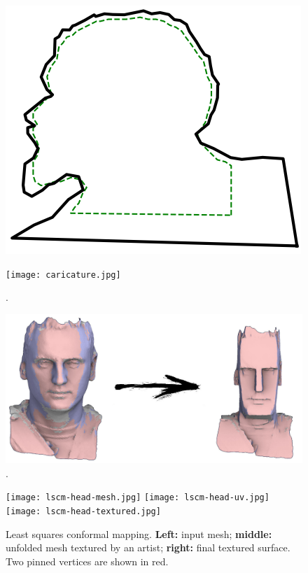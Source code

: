 \documentclass[notitlepage,oneside]{book}
\begin{document}
\begin{figure}[h]
\begin{minipage}{.25\linewidth}
    \includegraphics[width=\linewidth]{example_6.3_e.png}
    \caption{}
    \label{fig:lenin}
\end{minipage}
\end{figure}




\begin{figure}[ht]
    \centering
    \texttt{[image: caricature.jpg]}
    \caption{.}
    \label{fig:caricature}
\end{figure}


\begin{figure}[ht]
	\centering
	\includegraphics[width=.8\linewidth]{cubify-flagging.jpg}
	\caption{.}
	\label{fig:????}
\end{figure}


\begin{figure}[ht]
	\centering
    \texttt{[image: lscm-head-mesh.jpg]}
    \quad
    \texttt{[image: lscm-head-uv.jpg]}
    \quad
    \texttt{[image: lscm-head-textured.jpg]}
	\caption{Least squares conformal mapping. \textbf{Left:} input mesh; \textbf{middle:} unfolded mesh textured by an artist; \textbf{right:} final textured surface. Two pinned vertices are shown in red.}
	\label{fig:????}
\end{figure}
\end{document}
